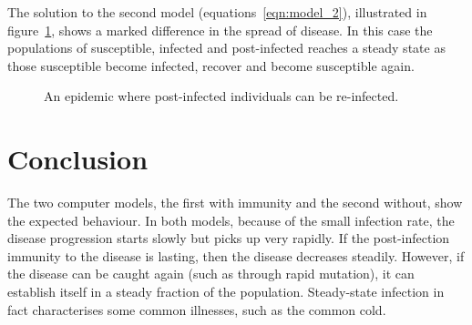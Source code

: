 \documentclass[a4paper,11pt]{article}
\begin{document}
The solution to the second model (equations~\ref{eqn:model_2}), illustrated in figure~\ref{fig:withreinfection}, shows a marked difference in the
spread of disease. In this case the populations of susceptible, infected and 
post-infected reaches a steady state as those susceptible become infected, recover 
and become susceptible again.
\begin{figure}[h!]
   \centering
{}
\caption{An epidemic where post-infected individuals can be re-infected.}
\label{fig:withreinfection}
\end{figure}

\section{Conclusion}

The two computer models, the first with immunity and the second without, show the expected behaviour. In both models, because of the small infection rate, the disease progression starts slowly but picks up very rapidly. If the post-infection immunity to the disease is lasting, then the disease decreases steadily. However, if the disease can be caught again (such as through rapid mutation), it can establish itself in a steady fraction of the population. Steady-state infection in fact characterises some common illnesses, such as the common cold.
\end{document}
